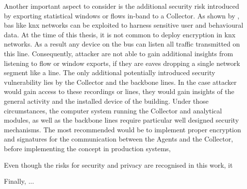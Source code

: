Another important aspect to consider is the additional security risk introduced by exporting statistical windows or flows in-band to a Collector.
As shown by \textcite{Mundt2012}, \gls{bas} like \gls{knx} networks can be exploited to harness sensitive user and behavioural data.
At the time of this thesis, it is not common to deploy encryption in \gls{knx} networks.
As a result any device on the bus can listen all traffic transmitted on this line.
Consequently, attacker are not able to gain additional insights from listening to flow or window exports, if they are eaves dropping a single network segment like a line.
The only additional potentially introduced security vulnerability lies by the Collector and the backbone lines. In the case attacker would gain access to these recordings or lines, they would gain insights of the general activity and the installed device of the building.
Under those circumstances, the computer system running the Collector and analytical modules, as well as the backbone lines require particular well designed security mechanisms.
The most recommended would be to implement proper encryption and signatures for the communication between the Agents and the Collector, before implementing the concept in production systems,

Even though the risks for security and privacy are recognised in this work, it 

Finally, ...

